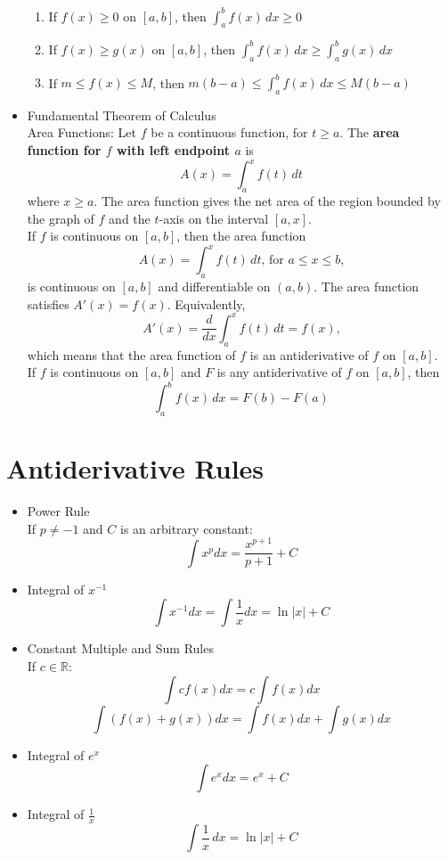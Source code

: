 \documentclass{article}
\begin{document}
\begin{itemize}
\begin{enumerate}
        \item If $f(x) \geq 0$ on $[a,b]$, then $\int_a^b{f(x)\,dx} \geq 0$
        \item If $f(x) \geq g(x)$ on $[a,b]$, then $\int_a^b{f(x)\,dx} \geq \int_a^b{g(x)\,dx}$
        \item If $m \leq f(x) \leq M$, then $m(b - a) \leq \int_a^b{f(x)\,dx} \leq M(b - a)$
    \end{enumerate}
    \item Fundamental Theorem of Calculus \\
        Area Functions: Let $f$ be a continuous function, for $t \geq a$. The \textbf{area function for $f$ with left endpoint $a$} is
        $$A(x) = \int_a^x{f(t)\,dt}$$
        where $x \geq a$. The area function gives the net area of the region bounded by the graph of $f$ and the $t$-axis on the interval $[a,x]$. \\
        If $f$ is continuous on $[a,b]$, then the area function
        $$A(x) = \int_a^x{f(t)\,dt}\text{, for } a \leq x \leq b\text{,}$$
        is continuous on $[a,b]$ and differentiable on $(a,b)$. The area function satisfies $A'(x) = f(x)$. Equivalently,
        $$A'(x) = \frac{d}{dx}\int_a^x{f(t)\,dt} = f(x)\text{,}$$
        which means that the area function of $f$ is an antiderivative of $f$ on $[a,b]$. \\
        If $f$ is continuous on $[a,b]$ and $F$ is any antiderivative of $f$ on $[a,b]$, then
        $$\int_a^b{f(x)\,dx} = F(b) - F(a)$$
\end{itemize}

\section*{Antiderivative Rules}
\begin{itemize}
    \item Power Rule \\
        If $p \neq -1$ and $C$ is an arbitrary constant:
        $$\int{x^p} dx = \frac{x^{p + 1}}{p + 1} + C$$
    \item Integral of $x^{-1}$
        $$\int{x^{-1}}dx = \int{\frac{1}{x}}dx = \ln{|x|} + C$$
    \item Constant Multiple and Sum Rules \\
        If $c \in \mathbb{R}$:
        $$\int{cf(x)}dx = c\int{f(x)}dx$$
        $$\int{\left(f(x) + g(x)\right)}dx = \int{f(x)}dx + \int{g(x)}dx$$
    \item Integral of $e^x$
        $$\int{e^x}dx = e^x + C$$
    \item Integral of $\frac{1}{x}$
        $$\int{\frac{1}{x}}\,dx = \ln{|x|} + C$$
\end{itemize}
\end{document}
